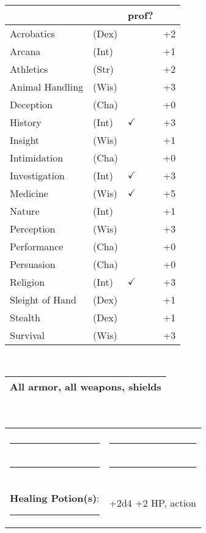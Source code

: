 \documentclass[twocolumn]{article}
\begin{document}
\\
\noindent\begin{tabular}{llll}
 & & prof? & \\
\hline
Acrobatics & (Dex) &  & +2 \\
Arcana & (Int) &  & +1 \\ 
Athletics & (Str) &  & +2\\
Animal Handling & (Wis) &  & +3\\
Deception & (Cha) &  & +0\\
History & (Int) & $\checkmark$ & +3 \\
Insight & (Wis) &  & +1 \\
Intimidation & (Cha) &  & +0 \\
Investigation & (Int) & $\checkmark$ & +3 \\
Medicine & (Wis) & $\checkmark$ & +5 \\
Nature & (Int) &  & +1 \\
Perception & (Wis) &  & +3 \\
Performance & (Cha) &  & +0 \\
Persuasion & (Cha) &  & +0 \\
Religion & (Int) & $\checkmark$ & +3 \\
Sleight of Hand & (Dex) &  & +1 \\
Stealth & (Dex) &  & +1 \\
Survival & (Wis) &  & +3 \\
\hline
\end{tabular}
\vspace{12pt}

\\
\noindent\begin{tabular}{|m{3.1in}|}
\hline
All armor, all weapons, shields \\
\hline
\end{tabular}
\vspace{12pt}


\\
\noindent\begin{tabular}{|ll|}
\hline&\\
\rule{1.4in}{.2pt}&\rule{1.4in}{.2pt}\\
\rule{1.4in}{.2pt}&\rule{1.4in}{.2pt}\\
\textbf{Healing Potion(s)}: \rule{.2in}{.2pt}& +2d4 +2 HP, {\sc action}\\
\hline
\end{tabular}
\vspace{12pt}
\end{document}
